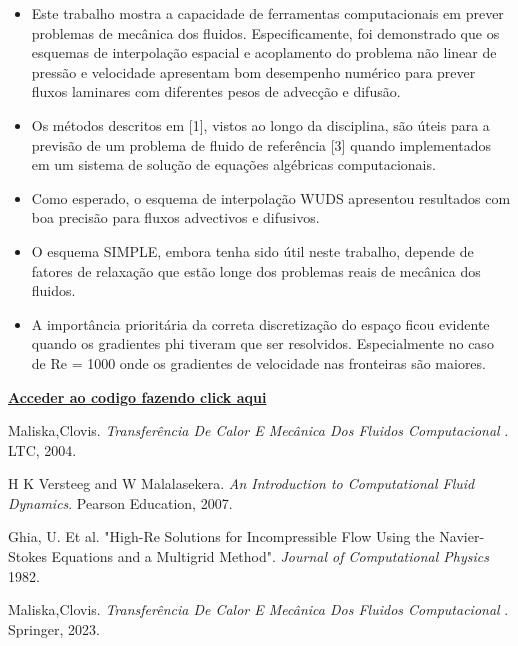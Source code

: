 \documentclass[]{article}
\begin{document}
\begin{itemize}
	\item Este trabalho mostra a capacidade de ferramentas computacionais em prever problemas de mecânica dos fluidos. Especificamente, foi demonstrado que os esquemas de interpolação espacial e acoplamento do problema não linear de pressão e velocidade apresentam bom desempenho numérico para prever fluxos laminares com diferentes pesos de advecção e difusão.
	\item Os métodos descritos em [1], vistos ao longo da disciplina, são úteis para a previsão de um problema de fluido de referência [3] quando implementados em um sistema de solução de equações algébricas computacionais.
	\item Como esperado, o esquema de interpolação WUDS apresentou resultados com boa precisão para fluxos advectivos e difusivos.
	\item O esquema SIMPLE, embora tenha sido útil neste trabalho, depende de fatores de relaxação que estão longe dos problemas reais de mecânica dos fluidos.
	\item A importância prioritária da correta discretização do espaço ficou evidente quando os gradientes phi tiveram que ser resolvidos. Especialmente no caso de Re = 1000 onde os gradientes de velocidade nas fronteiras são maiores.
	
\end{itemize}

\textbf{\href{https://drive.google.com/file/d/1bugQAO7Zut6hmg514VoiJRC326zx53RL/view?usp=sharing}{Acceder ao codigo fazendo click aqui}}



\begin{thebibliography}{99}
	
	Maliska,Clovis. 
	\textit{Transferência De Calor E Mecânica Dos Fluidos Computacional }. LTC, 2004.
	
	H K Versteeg and W Malalasekera. 
	\textit{An Introduction
		to Computational
		Fluid Dynamics}. Pearson Education, 2007.
	
	Ghia, U. Et al.
	"High-Re Solutions for Incompressible Flow
	Using the Navier-Stokes Equations and a
	Multigrid Method". \textit{Journal of Computational Physics} 1982.
	
	Maliska,Clovis. 
	\textit{Transferência De Calor E Mecânica Dos Fluidos Computacional }. Springer, 2023.
	
\end{thebibliography}
\end{document}

